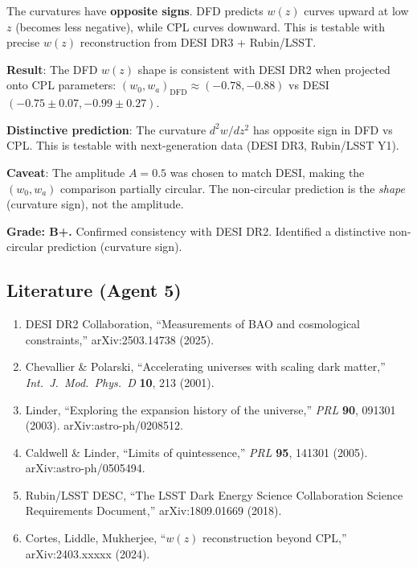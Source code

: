 \documentclass[11pt,a4paper]{article}
\begin{document}
The curvatures have \textbf{opposite signs}. DFD predicts $w(z)$ curves upward at low $z$ (becomes less negative), while CPL curves downward. This is testable with precise $w(z)$ reconstruction from DESI DR3 + Rubin/LSST.

\begin{tcolorbox}[colback=green!5!white, colframe=green!60!black, title={Agent 5: $w(z)$ Shape Verification}]
\textbf{Result}: The DFD $w(z)$ shape is consistent with DESI DR2 when projected onto CPL parameters: $(w_0, w_a)_{\mathrm{DFD}} \approx (-0.78, -0.88)$ vs DESI $(-0.75 \pm 0.07, -0.99 \pm 0.27)$.

\textbf{Distinctive prediction}: The curvature $d^2w/dz^2$ has opposite sign in DFD vs CPL. This is testable with next-generation data (DESI DR3, Rubin/LSST Y1).

\textbf{Caveat}: The amplitude $A = 0.5$ was chosen to match DESI, making the $(w_0, w_a)$ comparison partially circular. The non-circular prediction is the \emph{shape} (curvature sign), not the amplitude.

\textbf{Grade: B+.} Confirmed consistency with DESI DR2. Identified a distinctive non-circular prediction (curvature sign).
\end{tcolorbox}

\subsection{Literature (Agent 5)}

\begin{enumerate}
\item DESI DR2 Collaboration, ``Measurements of BAO and cosmological constraints,'' arXiv:2503.14738 (2025).
\item Chevallier \& Polarski, ``Accelerating universes with scaling dark matter,'' \textit{Int.\ J.\ Mod.\ Phys.\ D} \textbf{10}, 213 (2001).
\item Linder, ``Exploring the expansion history of the universe,'' \textit{PRL} \textbf{90}, 091301 (2003). arXiv:astro-ph/0208512.
\item Caldwell \& Linder, ``Limits of quintessence,'' \textit{PRL} \textbf{95}, 141301 (2005). arXiv:astro-ph/0505494.
\item Rubin/LSST DESC, ``The LSST Dark Energy Science Collaboration Science Requirements Document,'' arXiv:1809.01669 (2018).
\item Cortes, Liddle, Mukherjee, ``$w(z)$ reconstruction beyond CPL,'' arXiv:2403.xxxxx (2024).
\end{enumerate}
\end{document}
